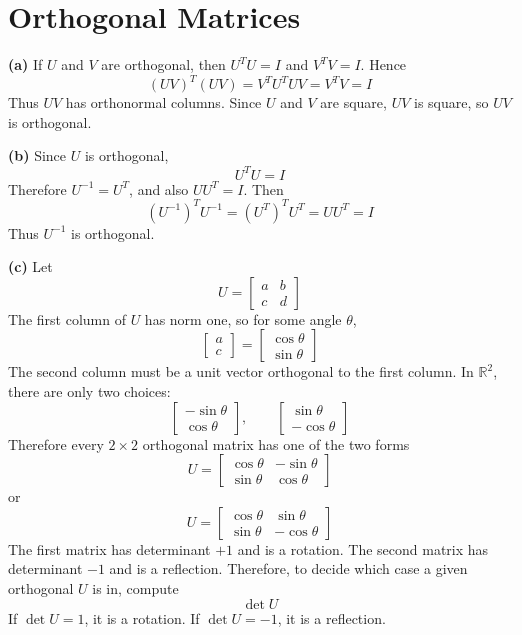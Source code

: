 \section{Orthogonal Matrices}

\textbf{(a)}
If \(U\) and \(V\) are orthogonal, then \(U^T U=I\) and \(V^T V=I\). Hence
\[
(UV)^T(UV)=V^T U^T U V=V^T V=I
\]
Thus \(UV\) has orthonormal columns. Since \(U\) and \(V\) are square, \(UV\) is square, so \(UV\) is orthogonal.

\textbf{(b)}
Since \(U\) is orthogonal,
\[
U^T U=I
\]
Therefore \(U^{-1}=U^T\), and also \(U U^T=I\). Then
\[
(U^{-1})^T U^{-1}=(U^T)^T U^T=U U^T=I
\]
Thus \(U^{-1}\) is orthogonal.

\textbf{(c)}
Let
\[
U=\begin{bmatrix}a&b\\c&d\end{bmatrix}
\]
The first column of \(U\) has norm one, so for some angle \(\theta\),
\[
\begin{bmatrix}a\\c\end{bmatrix}
=
\begin{bmatrix}\cos\theta\\ \sin\theta\end{bmatrix}
\]
The second column must be a unit vector orthogonal to the first column. In \(\mathbb{R}^2\), there are only two choices:
\[
\begin{bmatrix}-\sin\theta\\ \cos\theta\end{bmatrix},
\qquad
\begin{bmatrix}\sin\theta\\ -\cos\theta\end{bmatrix}
\]
Therefore every \(2\times 2\) orthogonal matrix has one of the two forms
\[
U=
\begin{bmatrix}
\cos\theta&-\sin\theta\\
\sin\theta& \cos\theta
\end{bmatrix}
\]
or
\[
U=
\begin{bmatrix}
\cos\theta& \sin\theta\\
\sin\theta&-\cos\theta
\end{bmatrix}
\]
The first matrix has determinant \(+1\) and is a rotation. The second matrix has determinant \(-1\) and is a reflection. Therefore, to decide which case a given orthogonal \(U\) is in, compute
\[
\det U
\]
If \(\det U=1\), it is a rotation. If \(\det U=-1\), it is a reflection.

